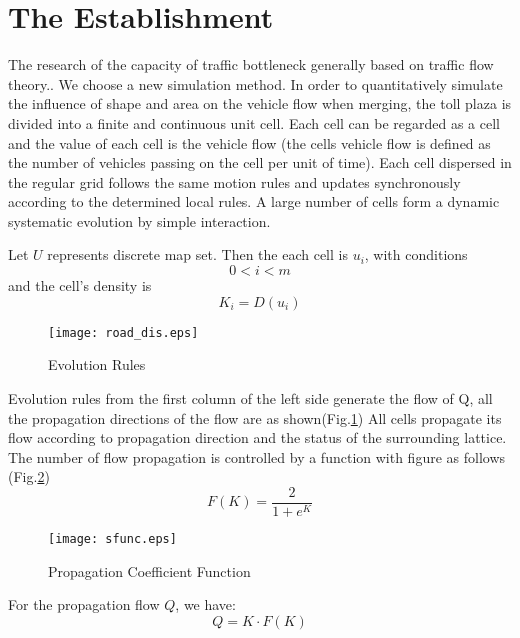 \documentclass{mcmthesis}
\begin{document}
\section{The Establishment }
The research of the capacity of traffic bottleneck generally based on traffic flow theory.\cite{vickrey1969congestion}\cite{Xiao201448}. We choose a new simulation method.
In order to quantitatively simulate the influence of shape and area on the vehicle flow when merging, the toll plaza is divided into a finite and continuous unit cell. Each cell can be regarded as a cell and the value of each cell is the vehicle flow (the cells vehicle flow is defined as the number of vehicles passing on the cell per unit of time). Each cell dispersed in the regular grid follows the same motion rules and updates synchronously according to the determined local rules. A large number of cells form a dynamic systematic evolution by simple interaction.

Let $U$ represents discrete map set. Then the each cell is $u_i$, with conditions 
$$0<i<m$$
and the cell's density is $$K_i=D(u_i)$$
\begin{figure}[h]
\small
\centering
\texttt{[image: road\_dis.eps]}
\caption{\label{fig:road_dis}Evolution Rules} 
\end{figure}

Evolution rules from the first column of the left side generate the flow of Q, all the propagation directions of the flow are as shown(Fig.\ref{fig:road_dis})
All cells propagate its flow according to propagation direction and the status of the surrounding lattice. The number of flow propagation is controlled by a function with figure as follows (Fig.\ref{fig:s_func})
\begin{equation}
F(K)=\frac{2}{1+e^{K}}
\label{eq:s_func}
\end{equation}
\begin{figure}[!htbp]
	\small
	\centering
	\texttt{[image: sfunc.eps]}
	\caption{\label{fig:s_func}Propagation Coefficient Function} 
\end{figure}
For the propagation flow $Q$, we have: 
\begin{equation}
	\label{eq:q}
	Q=K \cdot F(K)
\end{equation}
\end{document}
